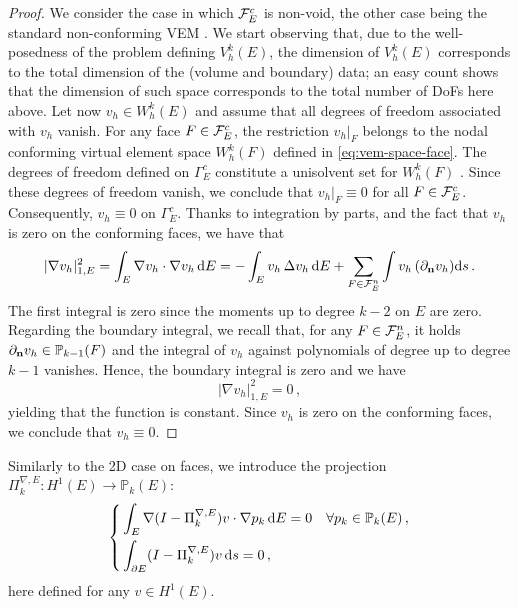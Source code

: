 \documentclass[a4paper,11pt]{article}
\theoremstyle{remark}
\theoremstyle{definition}
\newcounter{corr}
\newcommand{\Pol}{\mathbb{P}}
\newcommand{\PiNablaE}{\Pi^{\nabla,E}_k}
\begin{document}
\begin{proof}
We consider the case in which ${\cal F}^c_E$ is non-void, the other case being the standard non-conforming VEM \cite{AyusodeDios-Lipnikov-Manzini:2016}. We start observing that, due to the well-posedness of the problem defining $V_h^k(E)$, the dimension of $V_h^k(E)$ corresponds to the total dimension of the (volume and boundary) data; an easy count shows that the dimension of such space corresponds to the total number of DoFs here above.
Let now $v_h \in W_h^k(E)$ and assume that all degrees of freedom associated with $v_h$ vanish.
For any face $F \in {\cal F}^c_E$, the restriction $v_h|_F$ belongs to the nodal conforming virtual element space $W_h^k(F)$ defined in \eqref{eq:vem-space-face}. The degrees of freedom defined on $\Gamma^c_E$ constitute a unisolvent set for $W_h^k(F)$ \cite{BeiradaVeiga-Brezzi-Cangiani-Manzini-Marini-Russo:2013}. Since these degrees of freedom vanish, we conclude that $v_h|_F \equiv 0$ for all $F \in {\cal F}^c_E$. Consequently, $v_h \equiv 0$ on $\Gamma^c_E$.
Thanks to integration by parts, and the fact that $v_h$ is zero on the conforming faces, we have that
\[
|\nabla v_h|^2_{1,E} = \int_E \nabla v_h \cdot \nabla v_h \, {\rm d}E = - \int_E v_h \, \Delta v_h \, {\rm d}E + \sum_{F \in {\cal F}_E^n} \int v_h \, (\partial_{\bf n} v_h) {\rm d} s \, .
\]
The first integral is zero since the moments up to degree $k-2$ on $E$ are zero.
Regarding the boundary integral, we recall that, for any $F \in {\cal F}_E^n$, it holds 
$\partial_{\bf n} v_h \in \Pol_{k-1}(F)$ and the integral of $v_h$ against polynomials of degree up to degree $k-1$ vanishes. 
Hence, the boundary integral is zero and we have
\[
| \nabla v_h|^2_{1,E} = 0 \, ,  
\]
yielding that the function is constant. Since $v_h$ is zero on the conforming faces, we conclude that $v_h \equiv 0$. 
\end{proof}
Similarly to the 2D case on faces, we introduce the projection $\PiNablaE : H^1(E) \rightarrow \Pol_k(E)$: 
\begin{equation}
\left\{
\begin{aligned}
&\int_E \nabla (I - \PiNablaE) v \cdot \nabla p_k \,{\rm d}E = 0 \quad \forall p_k\in\Pol_k(E) \, , \\
&  \int_{\partial E} (I - \PiNablaE) v \,{\rm d}s   = 0 \, ,
\end{aligned}
\right .
\label{eqn:scalPiNabla}
\end{equation}
here defined for any $v \in H^1(E)$.
\end{document}
